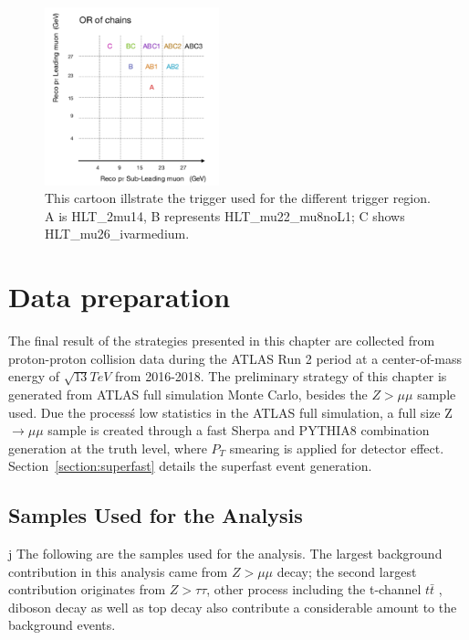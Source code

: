 \begin{figure}[!htb]
    \begin{center}
        \includegraphics[width=0.45\textwidth]{figures/chapter_dimuon/TriggerChain}        
        \caption{
        This cartoon illstrate the trigger used for the different trigger region. A is HLT\_2mu14, B represents HLT\_mu22\_mu8noL1; C shows HLT\_mu26\_ivarmedium. }
    \end{center}
\end{figure}

\section{Data preparation}
The final result of the strategies presented in this chapter are collected from proton-proton collision data during the ATLAS Run 2 period at a center-of-mass energy of $\sqrt{13} TeV$ from 2016-2018. The preliminary strategy of this chapter is generated from ATLAS full simulation Monte Carlo, besides the $Z > \mu \mu $ sample used. Due the process\'s low statistics in the ATLAS full simulation, a full size Z $\rightarrow \mu \mu$ sample is created through a fast Sherpa and PYTHIA8 combination generation at the truth level, where $P_{T}$ smearing is applied for detector effect. Section~\ref{section:superfast} details the superfast event generation.

\subsection{Samples Used for the Analysis}j
The following are the samples used for the analysis. The largest background contribution in this analysis came from $Z > \mu\mu $ decay; the second largest contribution originates from $Z > \tau \tau$, other process including the t-channel $t\bar{t}$ , diboson decay as well as top decay also contribute a considerable amount to the background events.

